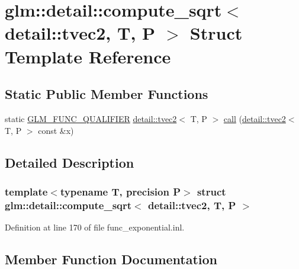 \hypertarget{structglm_1_1detail_1_1compute__sqrt_3_01detail_1_1tvec2_00_01_t_00_01_p_01_4}{}\section{glm\+:\+:detail\+:\+:compute\+\_\+sqrt$<$ detail\+:\+:tvec2, T, P $>$ Struct Template Reference}
\label{structglm_1_1detail_1_1compute__sqrt_3_01detail_1_1tvec2_00_01_t_00_01_p_01_4}
\subsection*{Static Public Member Functions}
\begin{DoxyCompactItemize}
\item 
static \hyperlink{setup_8hpp_a33fdea6f91c5f834105f7415e2a64407}{G\+L\+M\+\_\+\+F\+U\+N\+C\+\_\+\+Q\+U\+A\+L\+I\+F\+I\+ER} \hyperlink{structglm_1_1detail_1_1tvec2}{detail\+::tvec2}$<$ T, P $>$ \hyperlink{structglm_1_1detail_1_1compute__sqrt_3_01detail_1_1tvec2_00_01_t_00_01_p_01_4_aa1063e71bb3144910901a224d41d88f7}{call} (\hyperlink{structglm_1_1detail_1_1tvec2}{detail\+::tvec2}$<$ T, P $>$ const \&x)
\end{DoxyCompactItemize}


\subsection{Detailed Description}
\subsubsection*{template$<$typename T, precision P$>$\newline
struct glm\+::detail\+::compute\+\_\+sqrt$<$ detail\+::tvec2, T, P $>$}



Definition at line 170 of file func\+\_\+exponential.\+inl.



\subsection{Member Function Documentation}
\mbox{\label{structglm_1_1detail_1_1compute__sqrt_3_01detail_1_1tvec2_00_01_t_00_01_p_01_4_aa1063e71bb3144910901a224d41d88f7}} 
